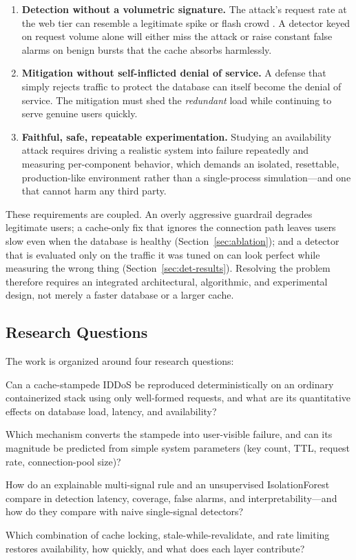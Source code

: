 \documentclass[preprint,12pt]{elsarticle}
\begin{document}
\begin{enumerate}[label=\textbf{T\arabic*.},leftmargin=*]
\item \textbf{Detection without a volumetric signature.} The attack's request rate at
the web tier can resemble a legitimate spike or flash crowd \cite{jung2002,kandula2005}.
A detector keyed on request volume alone will either miss the attack or raise
constant false alarms on benign bursts that the cache absorbs harmlessly.
\item \textbf{Mitigation without self-inflicted denial of service.} A defense that
simply rejects traffic to protect the database can itself become the denial of
service. The mitigation must shed the \emph{redundant} load while continuing to serve
genuine users quickly.
\item \textbf{Faithful, safe, repeatable experimentation.} Studying an availability
attack requires driving a realistic system into failure repeatedly and measuring
per-component behavior, which demands an isolated, resettable, production-like
environment rather than a single-process simulation---and one that cannot harm any
third party.
\end{enumerate}

These requirements are coupled. An overly aggressive guardrail degrades legitimate
users; a cache-only fix that ignores the connection path leaves users slow even when
the database is healthy (Section~\ref{sec:ablation}); and a detector that is evaluated
only on the traffic it was tuned on can look perfect while measuring the wrong thing
(Section~\ref{sec:det-results}). Resolving the problem therefore requires an integrated
architectural, algorithmic, and experimental design, not merely a faster database or a
larger cache.

\subsection{Research Questions}
The work is organized around four research questions:
\begin{description}[leftmargin=1.2em,style=nextline]
\item[RQ1 (Reproduction).] Can a cache-stampede IDDoS be reproduced deterministically
on an ordinary containerized stack using only well-formed requests, and what are its
quantitative effects on database load, latency, and availability?
\item[RQ2 (Mechanism).] Which mechanism converts the stampede into user-visible failure,
and can its magnitude be predicted from simple system parameters (key count, TTL,
request rate, connection-pool size)?
\item[RQ3 (Detection).] How do an explainable multi-signal rule and an unsupervised
IsolationForest compare in detection latency, coverage, false alarms, and
interpretability---and how do they compare with naive single-signal detectors?
\item[RQ4 (Mitigation).] Which combination of cache locking, stale-while-revalidate,
and rate limiting restores availability, how quickly, and what does each layer
contribute?
\end{description}
\end{document}
